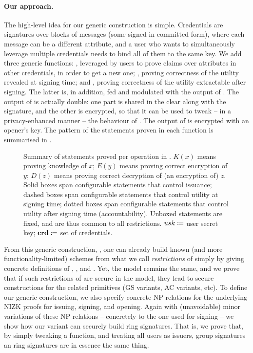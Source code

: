 \paragraph{Our approach.} %
The high-level idea for our generic construction is simple. Credentials are
signatures over blocks of messages (some signed in committed form), where each
message can be a different attribute, and a user who wants to simultaneously
leverage multiple credentials needs to bind all of them to the same key. We add
three generic functions: \fissue, leveraged by users to
prove claims over attributes in other credentials, in order to get a new one;
\feval, proving correctness of the utility revealed at signing time; and \finsp,
proving correctness of the utility extractable after signing. The latter is, in
addition, fed and modulated with the output of \feval. The output of \feval is
actually double: one part is shared in the clear along with the signature, and
the other is encrypted, so that it can be used to tweak -- in a privacy-enhanced
manner -- the behaviour of \finsp. The output of \finsp is encrypted with an
opener's key. The pattern of the statements proven in each function is
summarised in .

\begin{figure}[ht!]
  \centering
  \scalebox{0.9}{
    
  }
  \caption{Summary of statements proved per operation in \UAS.
    $K(x)$ means proving knowledge of $x$; $E(y)$ means proving correct
    encryption of $y$; $D(z)$ means proving correct decryption of (an encryption
    of) $z$. Solid boxes span configurable statements that control issuance;
    dashed boxes span configurable statements that control utility at signing
    time; dotted boxes span configurable statements that control utility after
    signing time (accountability). Unboxed statements are fixed, and are thus
    common to all \UAS restrictions. $usk \coloneqq$ user secret key; $\mathbf{crd}
    \coloneqq$ set of credentials.}
  \label{fig:proof-blocks-uas}
\end{figure}

From this generic construction, \CUASGen, one can already build known (and more
functionality-limited) schemes from what we call \emph{restrictions} of
\CUASGen simply by giving concrete definitions of \fissue, \feval, and \finsp.
Yet, the model remains the same, and we prove that if such restrictions of
\CUASGen are secure in the \UAS model, they lead to secure constructions for
the related primitives (GS variants, AC variants, etc). To define our generic
construction, we also specify concrete NP relations for the underlying NIZK
proofs for issuing, signing, and opening. Again with (unavoidable) minor variations
of these NP relations -- concretely to the one used for signing -- we show how
our \CUASGen variant can securely build ring signatures. That is, we prove that,
by simply tweaking a function, and treating all users as issuers, group
signatures an ring signatures are in essence the same thing.

